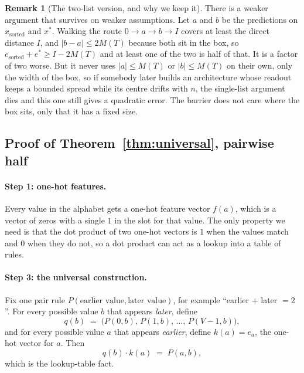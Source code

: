 \documentclass[10pt]{article}
\theoremstyle{definition}
\newtheorem{remark}{Remark}
\begin{document}
\begin{appendices}
\begin{remark}[The two-list version, and why we keep it]
\label{rem:twolist}
There is a weaker argument that survives on weaker assumptions. Let $a$ and
$b$ be the predictions on $x_{\text{sorted}}$ and $x^{*}$. Walking the route
$0 \rightarrow a \rightarrow b \rightarrow I$ covers at least the direct
distance $I$, and $|b - a| \leq 2M(T)$ because both sit in the box, so
$e_{\text{sorted}} + e^{*} \geq I - 2M(T)$ and at least one of the two is
half of that. It is a factor of two worse. But it never uses $|a| \leq M(T)$
or $|b| \leq M(T)$ on their own, only the width of the box, so if somebody
later builds an architecture whose readout keeps a bounded spread while its
centre drifts with $n$, the single-list argument dies and this one still
gives a quadratic error. The barrier does not care where the box sits, only
that it has a fixed size.
\end{remark}

\subsection{Proof of Theorem~\ref{thm:universal}, pairwise half}
\label{sec:proof-pair}

\paragraph{Step 1: one-hot features.}
Every value in the alphabet gets a one-hot feature vector $f(a)$, which
is a vector of zeros with a single $1$ in the slot for that value. The
only property we need is that the dot product of two one-hot vectors is
$1$ when the values match and $0$ when they do not, so a dot product can
act as a lookup into a table of rules.

\paragraph{Step 3: the universal construction.}
Fix one pair rule $P(\text{earlier value}, \text{later value})$, for
example ``earlier $+$ later $= 2$''. For every possible value $b$ that
appears \emph{later}, define
\begin{equation}
q(b) \;=\; \big(P(0,b),\, P(1,b),\, \dots,\, P(V-1,b)\big),
\label{eq:qb}
\end{equation}
and for every possible value $a$ that appears \emph{earlier}, define
$k(a) = e_a$, the one-hot vector for $a$. Then
\begin{equation}
q(b) \cdot k(a) \;=\; P(a,b),
\label{eq:lookup}
\end{equation}
which is the lookup-table fact.


\end{appendices}
\end{document}
